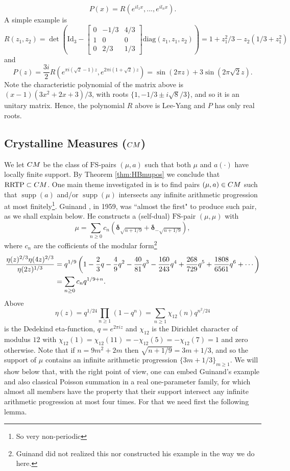\documentclass[a4paper,reqno,12pt]{amsart}
\DeclareMathOperator{\supp}{\mathrm{supp}}
\newcommand{\bo}{\boldsymbol}
\newcommand{\1}{{\bf 1}}
\newcommand{\fs}{\mathrm{FS}}
\newcommand{\rrtp}{\mathrm{RRTP}}
\newcommand{\cm}{\rm CM}
\renewcommand{\1}{{\bo 1}}
\newcommand{\del}{{\bo \delta}}
\renewcommand{\a}{a(\cdot)}
\begin{document}
$$
P(x)=R(e^{il_1x},...,e^{il_n x}).
$$
A simple example is
\[R(z_1,z_2)=\det\left(\text{Id}_3- \begin{bmatrix}
   0& -1/3 & 4/3 \\1 & 0& 0 \\ 0&  2/3 &1/3
\end{bmatrix}\text{diag}(z_1,z_1,z_2)\right) = 1+z_1^2/3-z_2(1/3+z_1^2)
\]
and
$$
P(z) = \frac{3i}2R(e^{\pi i (\sqrt{2}-1) z},e^{2 \pi i(1+ \sqrt{2}) z})=\sin(2\pi z)+3\sin(2\pi \sqrt{2} z).
$$
Note the characteristic polynomial of the matrix above is $(x-1)(3x^2+2x+3)/3$, with roots $\{1,-1/3\pm i\sqrt{8}/3\}$, and so it is an unitary matrix. Hence, the polynomial $R$ above is Lee-Yang and $P$ has only real roots.

\subsection{Crystalline Measures ($\cm$)}
We let $\cm$ be the class of $\fs$-pairs $(\mu,a)$ such that both $\mu$ and $\a$ have locally finite support. By Theorem \ref{thm:HBmupos} we conclude that $\rrtp\subset \cm$. One main theme investigated in \cite{KS,AV,ACV} is to find pairs $(\mu,a)\in \cm$ such that $\supp(a)$ and/or $\supp(\mu)$ intersects any infinite arithmetic progression at most finitely\footnote{So very non-periodic}. Guinand \cite[p. 265]{Gui}, in 1959, was ``almost the first" to produce such pair, as we shall explain below. He constructs a (self-dual) $\fs$-pair $(\mu,\mu)$ with
$$
\mu = \sum_{n\geq 0} c_n (\del_{\sqrt{n+1/9}}+\del_{-\sqrt{n+1/9}}),
$$
where $c_n$ are the cofficients of the modular form\footnote{Guinand did not realized this nor constructed his example in the way we do here.}
\begin{align}\label{eq:guiexa}
\begin{split}
\frac{\eta(z)^{2/3}\eta(4z)^{2/3}}{\eta(2z)^{1/3}} &= q^{1/9}\left(1
 - \frac{2}{3}\*q
 - \frac{4}{9}\*q^2
 - \frac{40}{81}\*q^3
 - \frac{160}{243}\*q^4
 + \frac{268}{729}\*q^5
 + \frac{1808}{6561}\*q^6 + \cdots\right) \\
& = \sum_{n\geq 0} c_n q^{1/9+n}.
\end{split}
\end{align}
Above
$$
\eta(z)=q^{1/24}\prod_{n\geq 1}(1-q^n) = \sum_{n\geq 1} \chi_{12}(n)q^{n^2/24}
$$
is the Dedekind eta-function, $q=e^{2\pi i z}$ and $\chi_{12}$ is the Dirichlet character of modulus $12$ with $\chi_{12}(1)=\chi_{12}(11)=-\chi_{12}(5)=-\chi_{12}(7)=1$ and zero otherwise.
Note that if $n=9m^2+2m$ then $\sqrt{n+1/9}=3m+1/3$, and so the support of $\mu$ contains an infinite arithmetic progression $\{3m+1/3\}_{m\geq 1}$.
We will show below that, with the right point of view, one can embed Guinand's example and also classical Poisson summation in a real one-parameter family, for which almost all members have the property that their support intersect any infinite arithmetic progression at most four times. For that we need first the following lemma.
\end{document}
